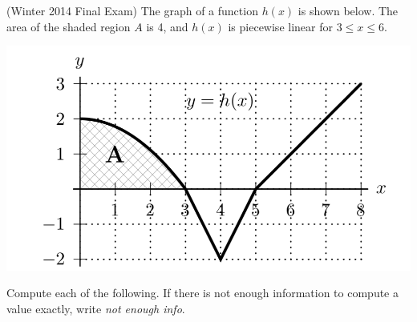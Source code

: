 \documentclass[11pt]{exam}
\begin{document}
\begin{questions}
      \question (Winter 2014 Final Exam) %
        The graph of a function $h(x)$ is shown below. The area of the shaded region $A$ is 4, and $h(x)$ is piecewise linear for $3 \leqslant x \leqslant 6$.
        \begin{center}
          \includegraphics[scale=0.5]{graph3.png}
        \end{center}
Compute each of the following. If there is not enough information to compute a value exactly, write \emph{not enough info}.

\end{questions}
\end{document}
